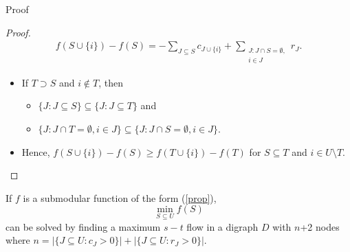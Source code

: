 \documentclass[usenames,dvipsnames]{beamer}
\begin{document}
\begin{frame}{Proof}
  \begin{proof}
    \begin{align*}
      f(S \cup \{i\}) - f(S) =
      -\sum\limits_{J \subseteq S} c_{J \cup \{i\}} + \sum\limits_{\substack{J: J \cap S = \emptyset,\\i \in J}} r_J.
    \end{align*}
    \begin{itemize}
    \item If $T \supset S$ and $i \not\in T$, then
      \begin{itemize}
      \item $\{J : J \subseteq S\} \subseteq \{J: J \subseteq T\}$ and
      \item $\{J: J \cap T = \emptyset,i\in J\} \subseteq \{J: J \cap S = \emptyset,i \in J\}$.
      \end{itemize}
      \item Hence, $f(S \cup \{i\}) - f(S) \geq f(T \cup \{i\}) -
        f(T)$ for $S \subseteq T$ and $i \in U \setminus T$.
    \end{itemize}
  \end{proof}
\end{frame}


\begin{frame}
  \begin{theorem}
    If $f$ is a submodular function of the form
    (\ref{prop}), \[\min\limits_{S \subseteq U} f(S)\] can be solved
    by finding a maximum $s-t$ flow in a digraph $D$ with $n$+2 nodes
    where $n = |\{J \subseteq U: c_J > 0\}| + |\{J \subseteq U: r_J >
    0\}|$.
  \end{theorem}
\end{frame}
\end{document}
